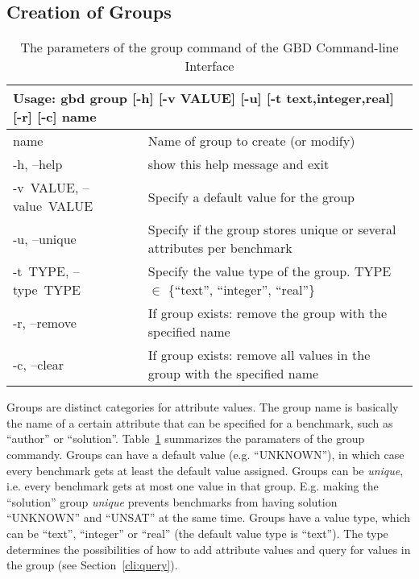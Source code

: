 \documentclass{easychair}
\begin{document}
\subsection{Creation of Groups}
\label{cli:group}

\begin{table}[ht]
\begin{tabular}{p{.17\linewidth}|p{.73\linewidth}}
\multicolumn{2}{l}{\bf Usage: \textsf{gbd group [-h] [-v VALUE] [-u] [-t {text,integer,real}] [-r] [-c] name}}\\

\hline
  \sf name                  &Name of group to create (or modify)\\

  \sf -h, --help            &show this help message and exit\\
  \sf \mbox{-v VALUE}, \mbox{--value VALUE}
                        &Specify a default value for the group\\
  \sf -u, --unique          &Specify if the group stores unique or several
                        attributes per benchmark\\
  \sf \mbox{-t TYPE}, \mbox{--type TYPE}
                        &Specify the value type of the group. 
                        \textsf{TYPE $\in$ \{``text'', ``integer'', ``real''\}}\\
  \sf -r, --remove          &If group exists: remove the group with the specified
                        name\\
  \sf -c, --clear           &If group exists: remove all values in the group with
                        the specified name
\end{tabular}
\caption{The parameters of the group command of the GBD Command-line Interface}
\label{fig:cli:group}
\end{table}

Groups are distinct categories for attribute values. 
The group name is basically the name of a certain attribute that can be specified for a benchmark, 
such as ``author'' or ``solution''.
Table~\ref{fig:cli:group} summarizes the paramaters of the group commandy. 
Groups can have a default value (e.g. ``UNKNOWN''), in which case every benchmark gets at least the default value assigned.
Groups can be \emph{unique}, i.e. every benchmark gets at most one value in that group.
E.g. making the ``solution'' group \emph{unique} prevents benchmarks from having solution ``UNKNOWN'' and ``UNSAT'' at the same time.
Groups have a value type, which can be ``text'', ``integer'' or ``real'' (the default value type is ``text'').
The type determines the possibilities of how to add attribute values and query for values in the group (see Section~\ref{cli:query}).
\end{document}
